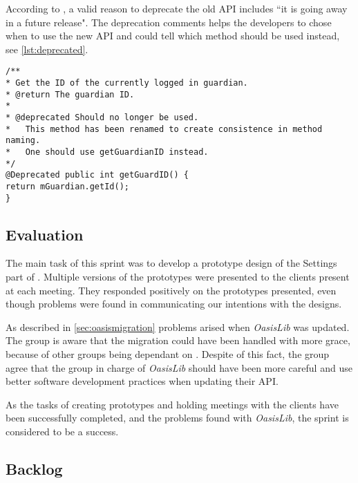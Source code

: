 According to \citet{deprecatedreference}, a valid reason to deprecate the old API includes ``it is going away in a future release". The deprecation comments helps the developers to chose when to use the new API and could tell which method should be used instead, see \cref{lst:deprecated}.

\begin{lstlisting}[caption={Example of a deprecated method could look like this.}, label={lst:deprecated}]
/**
* Get the ID of the currently logged in guardian.
* @return The guardian ID.
* 
* @deprecated Should no longer be used.
* 	This method has been renamed to create consistence in method naming.
*	One should use getGuardianID instead.
*/
@Deprecated public int getGuardID() {
return mGuardian.getId();
}
\end{lstlisting}

\subsection{Evaluation}
The main task of this sprint was to develop a prototype design of the Settings part of \launcher.
Multiple versions of the prototypes were presented to the clients present at each meeting.
They responded positively on the prototypes presented, even though problems were found in communicating our intentions with the designs.

As described in \cref{sec:oasismigration} problems arised when \textit{OasisLib} was updated.
The group is aware that the migration could have been handled with more grace, because of other groups being dependant on \launcher.
Despite of this fact, the group agree that the group in charge of \textit{OasisLib} should have been more careful and use better software development practices when updating their API.

As the tasks of creating prototypes and holding meetings with the clients have been successfully completed, and the problems found with \textit{OasisLib}, the sprint is considered to be a success.

\subsection{Backlog}\label{sec:sprint2:backlog}
